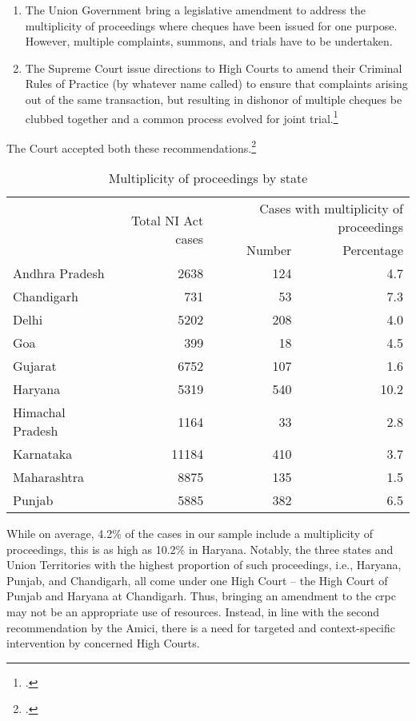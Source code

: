 \documentclass[12pt,a4paper]{article}
\begin{document}
	\begin{enumerate}
		\item The Union Government bring a legislative amendment to address the multiplicity of proceedings where cheques have been issued for one purpose. However, multiple complaints, summons, and trials have to be undertaken. 
		\item The Supreme Court issue directions to High Courts to amend their Criminal Rules of Practice (by whatever name called) to ensure that complaints arising out of the same transaction, but resulting in dishonor of multiple cheques be clubbed together and a common process evolved for joint trial.\footcite{amicus2020_submission}
	\end{enumerate}
	
	The Court accepted both these recommendations.\footcite{sc2020_138}
	
	\begin{longtable}{@{}lrrr@{}}
		\caption{Multiplicity of proceedings by state}\label{tab:state_multiplicity}\\
		\toprule
		\footnotesize
		\multirow{2}{*}{State} & \multirow{2}{*}{Total NI Act cases} & \multicolumn{2}{p{4cm}}{Cases with multiplicity of proceedings} \\
		\cmidrule{3-4}
		& & Number & Percentage \\
		\midrule
		\endhead
		Andhra Pradesh & 2638 & 124 & 4.7 \\
		Chandigarh & 731 & 53 & 7.3 \\
		Delhi & 5202 & 208 & 4.0 \\
		Goa & 399 & 18 & 4.5 \\
		Gujarat & 6752 & 107 & 1.6 \\
		Haryana & 5319 & 540 & 10.2 \\
		Himachal Pradesh & 1164 & 33 & 2.8 \\
		Karnataka & 11184 & 410 & 3.7 \\
		Maharashtra & 8875 & 135 & 1.5 \\
		Punjab & 5885 & 382 & 6.5 \\
		\bottomrule
	\end{longtable}
	
	While on average, 4.2\% of the cases in our sample include a multiplicity of proceedings, this is as high as 10.2\% in Haryana. Notably, the three states and Union Territories with the highest proportion of such proceedings, i.e., Haryana, Punjab, and Chandigarh, all come under one High Court -- the High Court of Punjab and Haryana at Chandigarh. Thus, bringing an amendment to the \gls{crpc} may not be an appropriate use of resources. Instead, in line with the second recommendation by the Amici, there is a need for targeted and context-specific intervention by concerned High Courts.
	
\end{document}
